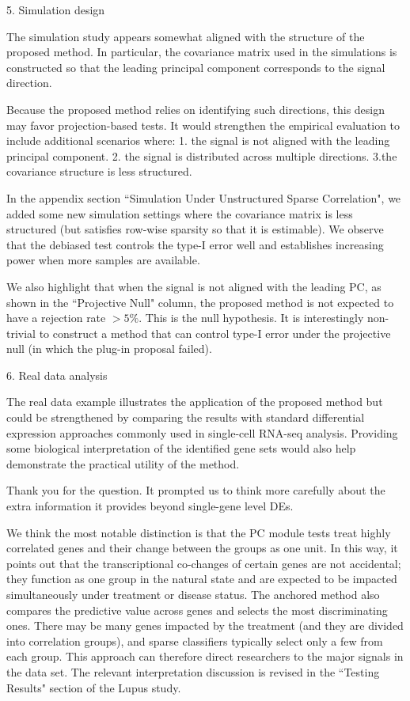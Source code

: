 \documentclass{article}
\theoremstyle{definition}
\begin{document}
\begin{shaded}
    5. Simulation design

The simulation study appears somewhat aligned with the structure of the proposed method. In particular, the covariance matrix used in the simulations is constructed so that the leading principal component corresponds to the signal direction.

Because the proposed method relies on identifying such directions, this design may favor projection-based tests. It would strengthen the empirical evaluation to include additional scenarios where: 1. the signal is not aligned with the leading principal component. 2. the signal is distributed across multiple directions. 3.the covariance structure is less structured.
\end{shaded}

In the appendix section ``Simulation Under Unstructured Sparse Correlation", we added some new simulation settings where the covariance matrix is less structured (but satisfies row-wise sparsity so that it is estimable). We observe that the debiased test controls the type-I error well and establishes increasing power when more samples are available.

We also highlight that when the signal is not aligned with the leading PC, as shown in the ``Projective Null" column, the proposed method is not expected to have a rejection rate $>5\%$. This is the null hypothesis. It is interestingly non-trivial to construct a method that can control type-I error under the projective null (in which the plug-in proposal failed).

\begin{shaded}
    6. Real data analysis

The real data example illustrates the application of the proposed method but could be strengthened by comparing the results with standard differential expression approaches commonly used in single-cell RNA-seq analysis. Providing some biological interpretation of the identified gene sets would also help demonstrate the practical utility of the method.
\end{shaded}

Thank you for the question. It prompted us to think more carefully about the extra information it provides beyond single-gene level DEs.

We think the most notable distinction is that the PC module tests treat highly correlated genes and their change between the groups as one unit. In this way, it points out that the transcriptional co-changes of certain genes are not accidental; they function as one group in the natural state and are expected to be impacted simultaneously under treatment or disease status. The anchored method also compares the predictive value across genes and selects the most discriminating ones. There may be many genes impacted by the treatment (and they are divided into correlation groups), and sparse classifiers typically select only a few from each group. This approach can therefore direct researchers to the major signals in the data set. The relevant interpretation discussion is revised in the ``Testing Results" section of the Lupus study.
\end{document}
